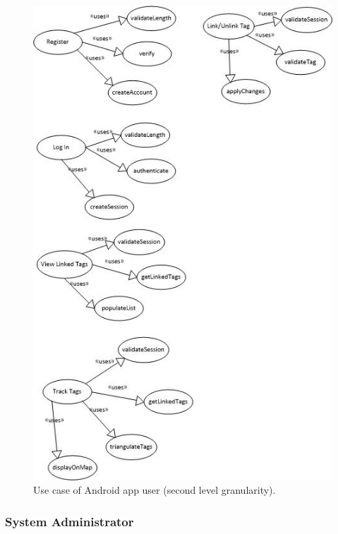 \documentclass[11pt,titlepage]{article} %
\begin{document}
\begin{figure}[H]
\centering
\includegraphics[scale=1]{AppUserLvl2.jpg}
\caption{Use case of Android app user (second level granularity).}
\end{figure}

\subsubsection{System Administrator}
\end{document}
